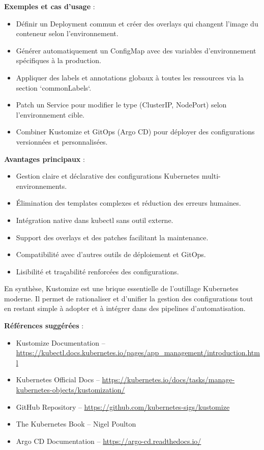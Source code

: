 \textbf{Exemples et cas d’usage} :
\begin{itemize}
	\item Définir un Deployment commun et créer des overlays qui changent l’image du conteneur selon l’environnement.
	\item Générer automatiquement un ConfigMap avec des variables d’environnement spécifiques à la production.
	\item Appliquer des labels et annotations globaux à toutes les ressources via la section `commonLabels`.
	\item Patch un Service pour modifier le type (ClusterIP, NodePort) selon l’environnement cible.
	\item Combiner Kustomize et GitOps (Argo CD) pour déployer des configurations versionnées et personnalisées.
\end{itemize}

\textbf{Avantages principaux} :
\begin{itemize}
	\item Gestion claire et déclarative des configurations Kubernetes multi-environnements.
	\item Élimination des templates complexes et réduction des erreurs humaines.
	\item Intégration native dans kubectl sans outil externe.
	\item Support des overlays et des patches facilitant la maintenance.
	\item Compatibilité avec d’autres outils de déploiement et GitOps.
	\item Lisibilité et traçabilité renforcées des configurations.
\end{itemize}

En synthèse, Kustomize est une brique essentielle de l’outillage Kubernetes moderne. Il permet de rationaliser et d’unifier la gestion des configurations tout en restant simple à adopter et à intégrer dans des pipelines d’automatisation.

\textbf{Références suggérées} :
\begin{itemize}
	\item Kustomize Documentation – \url{https://kubectl.docs.kubernetes.io/pages/app_management/introduction.html}
	\item Kubernetes Official Docs – \url{https://kubernetes.io/docs/tasks/manage-kubernetes-objects/kustomization/}
	\item GitHub Repository – \url{https://github.com/kubernetes-sigs/kustomize}
	\item The Kubernetes Book – Nigel Poulton
	\item Argo CD Documentation – \url{https://argo-cd.readthedocs.io/}
\end{itemize}

